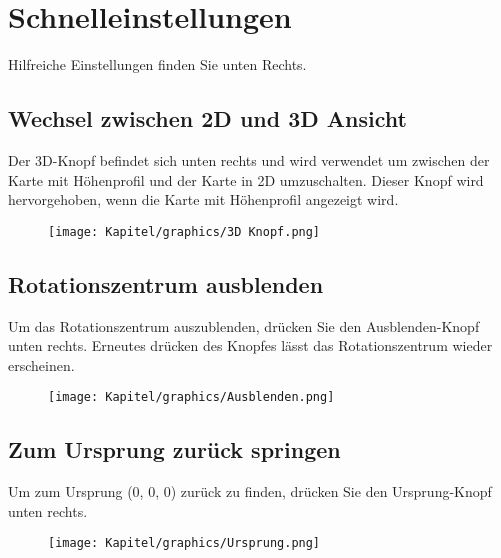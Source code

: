 \chapter{Schnelleinstellungen}
Hilfreiche Einstellungen finden Sie unten Rechts.

\section{Wechsel zwischen 2D und 3D Ansicht}
Der 3D-Knopf befindet sich unten rechts und wird verwendet um zwischen der Karte mit Höhenprofil und der Karte in 2D umzuschalten. Dieser Knopf wird hervorgehoben, wenn die Karte mit Höhenprofil angezeigt wird.

\begin{figure}[th]
    \centering
    \texttt{[image: Kapitel/graphics/3D Knopf.png]}
    \label{fig:enter-label}
\end{figure}

\newpage
\section{Rotationszentrum ausblenden}
Um das Rotationszentrum auszublenden, drücken Sie den Ausblenden-Knopf unten rechts. Erneutes drücken des Knopfes lässt das Rotationszentrum wieder erscheinen.

\begin{figure}[th]
    \centering
    \texttt{[image: Kapitel/graphics/Ausblenden.png]}
    \label{fig:enter-label}
\end{figure}

\newpage
\section{Zum Ursprung zurück springen}
Um zum Ursprung (0, 0, 0) zurück zu finden, drücken Sie den Ursprung-Knopf unten rechts. 

\begin{figure}[th]
    \centering
    \texttt{[image: Kapitel/graphics/Ursprung.png]}
    \label{fig:enter-label}
\end{figure}

